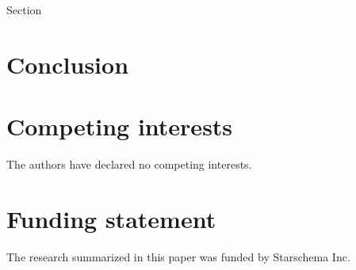\documentclass[fleqn,10pt]{SelfArx} %
\begin{document}
Section 



\section{Conclusion} %
\label{sec:conclusion}





\section*{Competing interests} %


The authors have declared no competing interests.

\section*{Funding statement} %


The research summarized in this paper was funded by Starschema Inc.






\end{document}
